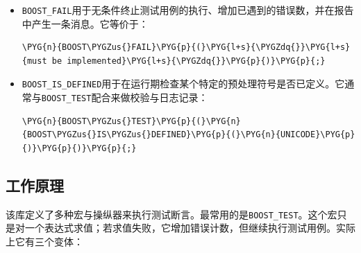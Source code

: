 \begin{itemize}

\item \texttt{BOOST\_\allowbreak{}FAIL}用于无条件终止测试用例的执行、增加已遇到的错误数，并在报告中产生一条消息。它等价于：



\begin{codeblockbg}
\begin{Verbatim}[commandchars=\\\{\},breaklines=true,breakanywhere=true,fontsize=\codefont,xleftmargin=17bp]
\PYG{n}{BOOST\PYGZus{}FAIL}\PYG{p}{(}\PYG{l+s}{\PYGZdq{}}\PYG{l+s}{must be implemented}\PYG{l+s}{\PYGZdq{}}\PYG{p}{)}\PYG{p}{;}
\end{Verbatim}
\end{codeblockbg}



\item \texttt{BOOST\_\allowbreak{}IS\_\allowbreak{}DEFINED}用于在运行期检查某个特定的预处理符号是否已定义。它通常与\texttt{BOOST\_\allowbreak{}TEST}配合来做校验与日志记录：



\begin{codeblockbg}
\begin{Verbatim}[commandchars=\\\{\},breaklines=true,breakanywhere=true,fontsize=\codefont,xleftmargin=17bp]
\PYG{n}{BOOST\PYGZus{}TEST}\PYG{p}{(}\PYG{n}{BOOST\PYGZus{}IS\PYGZus{}DEFINED}\PYG{p}{(}\PYG{n}{UNICODE}\PYG{p}{)}\PYG{p}{)}\PYG{p}{;}
\end{Verbatim}
\end{codeblockbg}

\end{itemize}



\subsection{工作原理}



该库定义了多种宏与操纵器来执行测试断言。最常用的是\texttt{BOOST\_\allowbreak{}TEST}。这个宏只是对一个表达式求值；若求值失败，它增加错误计数，但继续执行测试用例。实际上它有三个变体：



